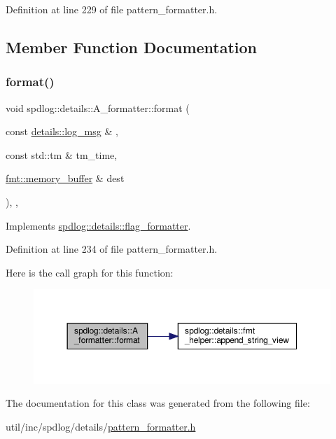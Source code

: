 Definition at line 229 of file pattern\+\_\+formatter.\+h.



\subsection{Member Function Documentation}
\mbox{\label{classspdlog_1_1details_1_1_a__formatter_a4df40ed70fbad25284e8479aefa680bb}} 
\subsubsection{\texorpdfstring{format()}{format()}}
{\footnotesize\ttfamily void spdlog\+::details\+::\+A\+\_\+formatter\+::format (\begin{DoxyParamCaption}\item[{const \hyperlink{structspdlog_1_1details_1_1log__msg}{details\+::log\+\_\+msg} \&}]{,  }\item[{const std\+::tm \&}]{tm\+\_\+time,  }\item[{\hyperlink{format_8h_a21cbf729f69302f578e6db21c5e9e0d2}{fmt\+::memory\+\_\+buffer} \&}]{dest }\end{DoxyParamCaption})\hspace{0.3cm}{\ttfamily [inline]}, {\ttfamily [override]}, {\ttfamily [virtual]}}



Implements \hyperlink{classspdlog_1_1details_1_1flag__formatter_a33fb3e42a4c8200cceb833d92b53fb67}{spdlog\+::details\+::flag\+\_\+formatter}.



Definition at line 234 of file pattern\+\_\+formatter.\+h.

Here is the call graph for this function\+:
\nopagebreak
\begin{figure}[H]
\begin{center}
\leavevmode
\includegraphics[width=350pt]{classspdlog_1_1details_1_1_a__formatter_a4df40ed70fbad25284e8479aefa680bb_cgraph}
\end{center}
\end{figure}


The documentation for this class was generated from the following file\+:\begin{DoxyCompactItemize}
\item 
util/inc/spdlog/details/\hyperlink{pattern__formatter_8h}{pattern\+\_\+formatter.\+h}\end{DoxyCompactItemize}

